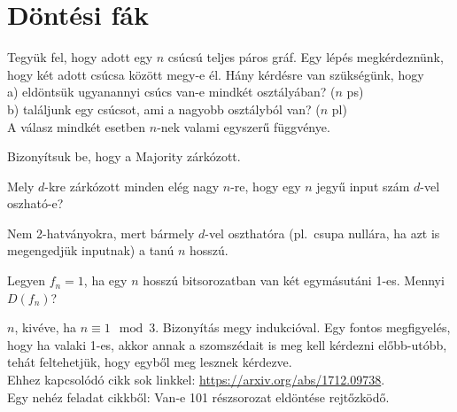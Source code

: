 \chapter{D\"ont\'esi f\'ak}

\begin{Exercise}[counter={sorszam}, difficulty=1]
	Tegy\"uk fel, hogy adott egy $n$ cs\'ucs\'u teljes p\'aros gr\'af. Egy l\'ep\'es megk\'erdezn\"unk, hogy k\'et adott cs\'ucsa k\"oz\"ott megy-e \'el. H\'any k\'erd\'esre van sz\"uks\'eg\"unk, hogy\\
	a) eld\"onts\"uk ugyanannyi cs\'ucs van-e mindk\'et oszt\'aly\'aban? ($n$ ps)\\
	b) tal\'aljunk egy cs\'ucsot, ami a nagyobb oszt\'alyb\'ol van? ($n$ pl)\\
	A v\'alasz mindk\'et esetben $n$-nek valami egyszer\H u f\"uggv\'enye.
\end{Exercise}	

\begin{Exercise}[counter={sorszam}, difficulty=0]
	Bizonyítsuk be, hogy a {\sc Majority} zárkózott.
\end{Exercise}

\begin{Exercise}[counter={sorszam}, difficulty=0]
	Mely $d$-kre zárkózott minden el\'eg nagy $n$-re, hogy egy $n$ jegy\H u input sz\'am $d$-vel oszhat\'o-e?
\end{Exercise}
\begin{Answer}
	Nem 2-hatv\'anyokra, mert b\'armely $d$-vel oszthat\'ora (pl.\ csupa null\'ara, ha azt is megengedj\"uk inputnak) a tan\'u $n$ hossz\'u.
\end{Answer}

\begin{Exercise}[counter={sorszam}, difficulty=0]
	Legyen $f_n=1$, ha egy $n$ hosszú bitsorozatban van két egymásutáni 1-es. Mennyi $D(f_n)$?
\end{Exercise}
\begin{Answer}
	$n$, kiv\'eve, ha $n\equiv 1 \mod 3$.
	Bizony\'it\'as megy indukci\'oval.
	Egy fontos megfigyel\'es, hogy ha valaki 1-es, akkor annak a szomsz\'edait is meg kell k\'erdezni el\H obb-ut\'obb, teh\'at feltehetj\"uk, hogy egyb\H ol meg lesznek k\'erdezve.\\
	Ehhez kapcsol\'od\'o cikk sok linkkel: \url{https://arxiv.org/abs/1712.09738}.\\
	Egy neh\'ez feladat cikkb\H ol: Van-e 101 r\'eszsorozat eld\"ont\'ese rejt\H ozk\"od\H o.
\end{Answer}

